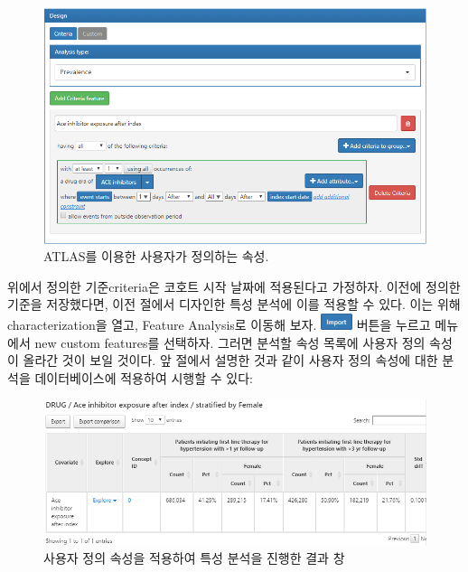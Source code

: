 \documentclass[10.5pt]{book}
\theoremstyle{definition}
\theoremstyle{definition}
\theoremstyle{definition}
\theoremstyle{remark}
\begin{document}
\begin{figure}

{\centering \includegraphics[width=1\linewidth]{images/Characterization/atlasCharacterizationCustomFeature} 

}

\caption{ATLAS를 이용한 사용자가 정의하는 속성.}\label{fig:atlasCharacterizationCustomFeature}
\end{figure}

위에서 정의한 기준criteria은 코호트 시작 날짜에 적용된다고 가정하자.
이전에 정의한 기준을 저장했다면, 이전 절에서 디자인한 특성 분석에 이를
적용할 수 있다. 이는 위해 characterization을 열고, Feature Analysis로
이동해 보자.
\includegraphics{images/Characterization/atlasImportButton.png} 버튼을
누르고 메뉴에서 new custom features를 선택하자. 그러면 분석할 속성
목록에 사용자 정의 속성이 올라간 것이 보일 것이다. 앞 절에서 설명한 것과
같이 사용자 정의 속성에 대한 분석을 데이터베이스에 적용하여 시행할 수
있다:

\begin{figure}

{\centering \includegraphics[width=1\linewidth]{images/Characterization/atlasCharacterizationCustomFeatureResults} 

}

\caption{사용자 정의 속성을 적용하여 특성 분석을 진행한 결과 창}\label{fig:atlasCharacterizationCustomFeatureResults}
\end{figure}
\end{document}
